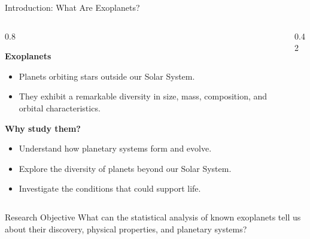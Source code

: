 \documentclass[aspectratio=169,11pt]{beamer}
\begin{document}
	\begin{frame}{Introduction: What Are Exoplanets?}
	
	\begin{columns}[T,onlytextwidth]
	
	\begin{column}{0.8\textwidth}
	
	\textbf{Exoplanets}
	
	\begin{itemize}
	\item Planets orbiting stars outside our Solar System.
	\item They exhibit a remarkable diversity in size, mass,
	composition, and orbital characteristics.
	\end{itemize}
	
	\vspace{0.3cm}
	
	\textbf{Why study them?}
	
	\begin{itemize}
	\item Understand how planetary systems form and evolve.
	\item Explore the diversity of planets beyond our
	Solar System.
	\item Investigate the conditions that could support life.
	\end{itemize}
	
	\end{column}
	
	\begin{column}{0.42\textwidth}
	
	\end{column}
	
	\end{columns}
	
	\vfill
	
	\begin{block}{Research Objective}
	What can the statistical analysis of known exoplanets
	tell us about their discovery, physical properties,
	and planetary systems?
	\end{block}
	
	\end{frame}

\end{document}
